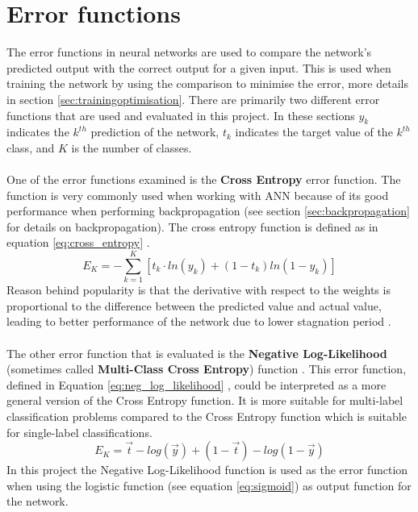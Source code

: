 \section{Error functions} \label{errorfunction}
The error functions in neural networks are used to compare the network's predicted output with the correct output for a given input. This is used when training the network by using the comparison to minimise the error, more details in section \ref{sec:trainingoptimisation}. There are primarily two different error functions that are used and evaluated in this project. In these sections $y_k$ indicates the $k^{th}$ prediction of the network, $t_k$ indicates the target value of the $k^{th}$ class, and $K$ is the number of classes.
\\\\
One of the error functions examined is the \textbf{Cross Entropy} error function. The function is very commonly used when working with ANN because of its good performance when performing backpropagation (see section \ref{sec:backpropagation} for details on backpropagation). The cross entropy function is defined as in equation \ref{eq:cross_entropy} \parencite{bishop2006crossEn}.
\begin{equation} \label{eq:cross_entropy}
    E_K = -\sum_{k=1}^{K} [t_k \cdot ln(y_k) +(1-t_k)ln(1-y_k) ]
\end{equation}
Reason behind popularity is that the derivative with respect to the weights is proportional to the difference between the predicted value and actual value, leading to better performance of the network due to lower stagnation period \parencite{nasr2002cross}.
\\\\
The other error function that is evaluated is the \textbf{Negative Log-Likelihood} (sometimes called \textbf{Multi-Class Cross Entropy}) function \parencite{bishop2006pattern}. This error function, defined in Equation \ref{eq:neg_log_likelihood} \parencite{tensorflow2016cross}, could be interpreted as a more general version of the Cross Entropy function. It is more suitable for multi-label classification problems compared to the Cross Entropy function which is suitable for single-label classifications.
\begin{equation} \label{eq:neg_log_likelihood}
    E_K = \vec{t} -log(\vec{y}) + (1-\vec{t}) -log(1-\vec{y})
\end{equation}
In this project the Negative Log-Likelihood function is used as the error function when using the logistic function (see equation \ref{eq:sigmoid}) as output function for the network.

